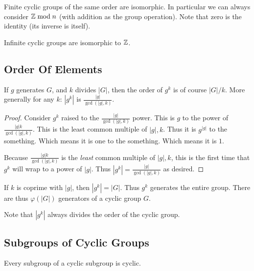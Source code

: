 \documentclass[11pt, oneside]{amsart}
\begin{document}
\begin{remark}
  Finite cyclic groups of the same order are isomorphic. In particular
  we can always consider $\mathbb{Z} \bmod n$ (with addition as the group
  operation). Note that zero is the identity (its inverse is itself).

  Infinite cyclic groups are isomorphic to $\mathbb{Z}$.
\end{remark}

\subsection{Order Of Elements}

\begin{proposition}
  If $g$ generates $G$, and $k$ divides $|G|$, then the order of $g^k$
  is of course $|G|/k$. More generally for any $k$: $|g^k|$ is
  $\frac{|g|}{\gcd(|g|, k)}$.
\end{proposition}

\begin{proof}
  Consider $g^k$ raised to the $\frac{|g|}{\gcd(|g|, k)}$ power. This is
  $g$ to the power of $\frac{|g|k}{\gcd(|g|, k)}$. This is the least
  common multiple of $|g|, k$. Thus it is $g^{|g|}$ to the something.
  Which means it is one to the something. Which means it is $1$.

  Because $\frac{|g|k}{\gcd(|g|, k)}$ is the \emph{least} common
  multiple of $|g|, k$, this is the first time that $g^k$ will wrap to a
  power of $|g|$. Thus $|g^k| = \frac{|g|}{\gcd(|g|, k)}$ as desired.
\end{proof}

\begin{remark}
  If $k$ is coprime with $|g|$, then $|g^k| = |G|$. Thus $g^k$ generates
  the entire group. There are thus $\varphi(|G|)$ generators of a cyclic
  group $G$.
\end{remark}

\begin{remark}
  Note that $|g^k|$ always divides the order of the cyclic group.
\end{remark}

\subsection{Subgroups of Cyclic Groups}

\begin{theorem}
  Every subgroup of a cyclic subgroup is cyclic.
\end{theorem}
\end{document}
